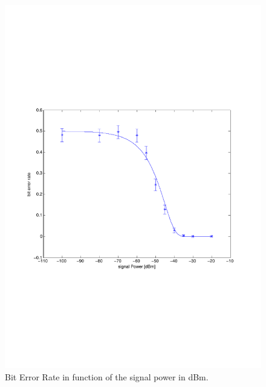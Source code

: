 \documentclass[a4paper]{article}
\begin{document}
\begin{figure}[H]
\centering
\includegraphics[width=\linewidth, trim= 0mm 85mm 0mm 85mm, clip]{berevolution.pdf}
\caption{Bit Error Rate in function of the signal power in dBm.}
\label{fig:berevolution}
\end{figure}
\end{document}
